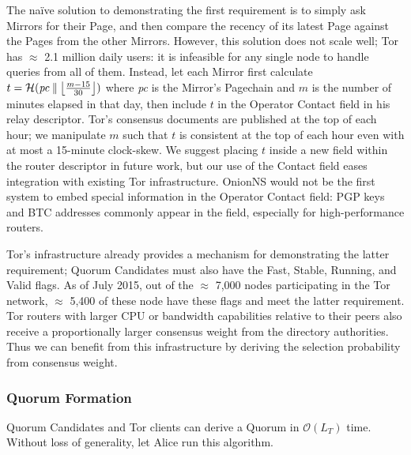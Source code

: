 \documentclass[conference]{IEEEtran}
\DeclarePairedDelimiter{\floor}{\lfloor}{\rfloor}
\newcommand*\concat{\mathbin{\|}}
\begin{document}
The na\"{i}ve solution to demonstrating the first requirement is to simply ask Mirrors for their Page, and then compare the recency of its latest Page against the Pages from the other Mirrors. However, this solution does not scale well; Tor has $ \approx $ 2.1 million daily users\cite{TorMetrics}: it is infeasible for any single node to handle queries from all of them. Instead, let each Mirror first calculate $ t = \mathcal{H}(\mathit{pc} \concat \floor[\big]{\frac{m - 15}{30}}) $ where \emph{pc} is the Mirror's Pagechain and $ m $ is the number of minutes elapsed in that day, then include $ t $ in the Operator Contact field in his relay descriptor. Tor's consensus documents are published at the top of each hour; we manipulate $ m $ such that $ t $ is consistent at the top of each hour even with at most a 15-minute clock-skew. We suggest placing $ t $ inside a new field within the router descriptor in future work, but our use of the Contact field eases integration with existing Tor infrastructure. OnionNS would not be the first system to embed special information in the Operator Contact field: PGP keys and BTC addresses commonly appear in the field, especially for high-performance routers.

Tor's infrastructure already provides a mechanism for demonstrating the latter requirement; Quorum Candidates must also have the Fast, Stable, Running, and Valid flags. As of July 2015, out of the $ \approx $ 7,000 nodes participating in the Tor network, $ \approx $ 5,400 of these node have these flags and meet the latter requirement\cite{TorMetrics}. Tor routers with larger CPU or bandwidth capabilities relative to their peers also receive a proportionally larger consensus weight from the directory authorities. Thus we can benefit from this infrastructure by deriving the selection probability from consensus weight.


\subsubsection{Quorum Formation}
\label{sec:qFormation}

Quorum Candidates and Tor clients can derive a Quorum in $ \mathcal{O}(L_{T}) $ time. Without loss of generality, let Alice run this algorithm.
\end{document}
